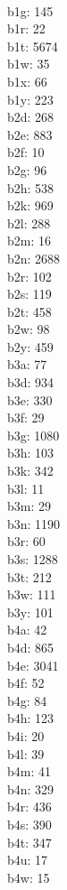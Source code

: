 \begin{multicols}{8}
  \\b1g: 145
  \\b1r: 22
  \\b1t: 5674
  \\b1w: 35
  \\b1x: 66
  \\b1y: 223
  \\b2d: 268
  \\b2e: 883
  \\b2f: 10
  \\b2g: 96
  \\b2h: 538
  \\b2k: 969
  \\b2l: 288
  \\b2m: 16
  \\b2n: 2688
  \\b2r: 102
  \\b2s: 119
  \\b2t: 458
  \\b2w: 98
  \\b2y: 459
  \\b3a: 77
  \\b3d: 934
  \\b3e: 330
  \\b3f: 29
  \\b3g: 1080
  \\b3h: 103
  \\b3k: 342
  \\b3l: 11
  \\b3m: 29
  \\b3n: 1190
  \\b3r: 60
  \\b3s: 1288
  \\b3t: 212
  \\b3w: 111
  \\b3y: 101
  \\b4a: 42
  \\b4d: 865
  \\b4e: 3041
  \\b4f: 52
  \\b4g: 84
  \\b4h: 123
  \\b4i: 20
  \\b4l: 39
  \\b4m: 41
  \\b4n: 329
  \\b4r: 436
  \\b4s: 390
  \\b4t: 347
  \\b4u: 17
  \\b4w: 15

\end{multicols}
